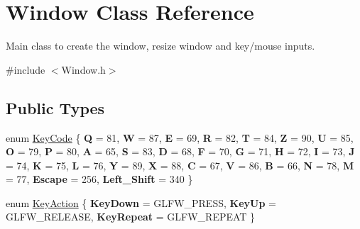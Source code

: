 \hypertarget{class_window}{}\section{Window Class Reference}
\label{class_window}


Main class to create the window, resize window and key/mouse inputs.  




{\ttfamily \#include $<$Window.\+h$>$}

\subsection*{Public Types}
\begin{DoxyCompactItemize}
\item 
enum \mbox{\hyperlink{class_window_a4915898e3e02586ae359c8cfb9114717}{Key\+Code}} \{ \newline
{\bfseries Q} = 81, 
{\bfseries W} = 87, 
{\bfseries E} = 69, 
{\bfseries R} = 82, 
\newline
{\bfseries T} = 84, 
{\bfseries Z} = 90, 
{\bfseries U} = 85, 
{\bfseries O} = 79, 
\newline
{\bfseries P} = 80, 
{\bfseries A} = 65, 
{\bfseries S} = 83, 
{\bfseries D} = 68, 
\newline
{\bfseries F} = 70, 
{\bfseries G} = 71, 
{\bfseries H} = 72, 
{\bfseries I} = 73, 
\newline
{\bfseries J} = 74, 
{\bfseries K} = 75, 
{\bfseries L} = 76, 
{\bfseries Y} = 89, 
\newline
{\bfseries X} = 88, 
{\bfseries C} = 67, 
{\bfseries V} = 86, 
{\bfseries B} = 66, 
\newline
{\bfseries N} = 78, 
{\bfseries M} = 77, 
{\bfseries Escape} = 256, 
{\bfseries Left\+\_\+\+Shift} = 340
 \}
\item 
enum \mbox{\hyperlink{class_window_ab44a7b55f0ce55c37d361fc51b302bdb}{Key\+Action}} \{ {\bfseries Key\+Down} = G\+L\+F\+W\+\_\+\+P\+R\+E\+SS, 
{\bfseries Key\+Up} = G\+L\+F\+W\+\_\+\+R\+E\+L\+E\+A\+SE, 
{\bfseries Key\+Repeat} = G\+L\+F\+W\+\_\+\+R\+E\+P\+E\+AT
 \}
\end{DoxyCompactItemize}
